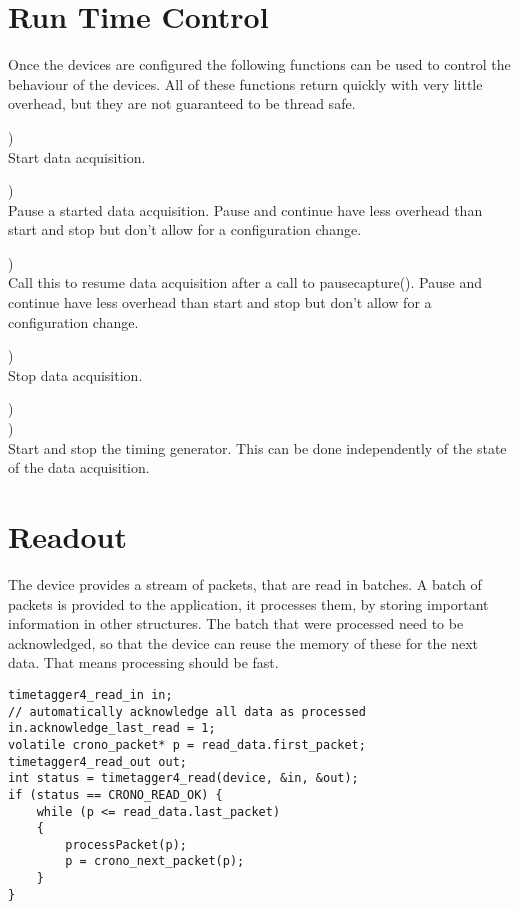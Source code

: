 
\section{Run Time Control}

Once the devices are configured the following functions can be used to control the behaviour of the devices. 
All of these functions return quickly with very little overhead, but they are not guaranteed to be thread safe.

	\device)\\
	Start data acquisition.\par

	\device)\\
	Pause a started data acquisition. 
	Pause and continue have less overhead than start and stop but don't allow for a configuration change.\par

	\device)\\
	Call this to resume data acquisition after a call to \textsf{\prefix pause\tu capture()}.
	Pause and continue have less overhead than start and stop but don't allow for a configuration change.\par

	\device)\\
	Stop data acquisition.\par
	
	\device)\\
	\device)\\
	Start and stop the timing generator. This can be done independently of the state of the data acquisition.\par	

\section{Readout}
    The device provides a stream of packets, that are read in batches. A batch of
    packets is provided to the application, it processes them, by storing important information
    in other structures. The batch that were processed need to be acknowledged, so that
    the device can reuse the memory of these for the next data. That means processing
    should be fast. 
    \begin{lstlisting}[numbers=none]
timetagger4_read_in in;
// automatically acknowledge all data as processed
in.acknowledge_last_read = 1;
volatile crono_packet* p = read_data.first_packet;
timetagger4_read_out out;
int status = timetagger4_read(device, &in, &out);
if (status == CRONO_READ_OK) {
    while (p <= read_data.last_packet)
    {
        processPacket(p);
        p = crono_next_packet(p);
    }    
}
        \end{lstlisting}
    

